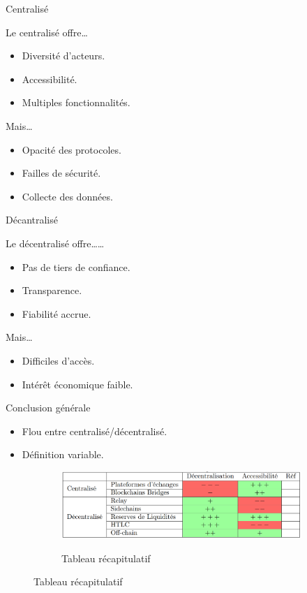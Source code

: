 \begin{frame}{Centralisé}
    \begin{block}{Le centralisé offre\dots}
        \begin{itemize}
            \item Diversité d'acteurs.
            \item Accessibilité.
            \item Multiples fonctionnalités.
        \end{itemize}
    \end{block}
    \pause
    \begin{block}{Mais\dots}
        \begin{itemize}
            \item Opacité des protocoles.
            \item Failles de sécurité.
            \item Collecte des données.
        \end{itemize}
    \end{block}
\end{frame}


\begin{frame}{Décantralisé}
    \begin{block}{Le décentralisé offre\dots\dots}
        \begin{itemize}
            \item Pas de tiers de confiance.
            \item Transparence.
            \item Fiabilité accrue.
        \end{itemize}
    \end{block}
    \pause
    \begin{block}{Mais\dots}
        \begin{itemize}
            \item Difficiles d'accès.
            \item Intérêt économique faible.
        \end{itemize}
    \end{block}
\end{frame}

\begin{frame}{Conclusion générale}
    \begin{itemize}
        \item Flou entre centralisé/décentralisé.
        \item Définition variable.
    \end{itemize}
\end{frame}

\begin{frame}
    \begin{figure}
        \begin{figure}
            \centering
            \includegraphics[scale = 0.2]{conclusion/tableau.png}
            \label{fig:recap}
            \caption{Tableau récapitulatif}
        \end{figure}
    \end{figure}
    
\end{frame}
